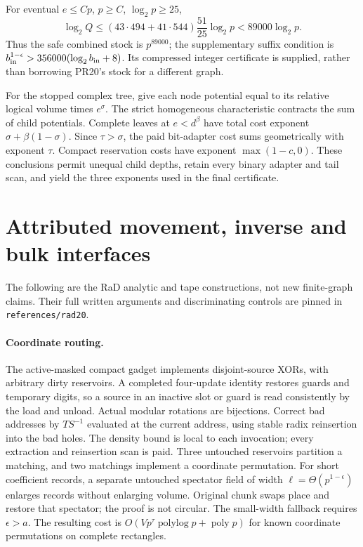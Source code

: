 \documentclass[11pt]{article}
\begin{document}
For eventual $e\le Cp$, $p\ge C$, $\log_2p\ge25$,
\[
 \log_2 Q\le(43\cdot494+41\cdot544)\frac{51}{25}\log_2p
 <89000\log_2p.
\]
Thus the safe combined stock is $p^{89000}$; the supplementary suffix
condition is
$b_{\rm in}^{1-\epsilon}>356000(\log_2 b_{\rm in}+8)$.
Its compressed integer certificate is supplied, rather than borrowing
PR20's stock for a different graph.

For the stopped complex tree, give each node potential equal to its
relative logical volume times $e^\sigma$. The strict homogeneous
characteristic contracts the sum of child potentials. Complete leaves
at $e<d^\beta$ have total cost exponent
$\sigma+\beta(1-\sigma)$. Since $\tau>\sigma$, the paid bit-adapter
cost sums geometrically with exponent $\tau$. Compact reservation costs
have exponent $\max(1-c,0)$. These conclusions permit unequal child
depths, retain every binary adapter and tail scan, and yield the three
exponents used in the final certificate.

\section{Attributed movement, inverse and bulk interfaces}
The following are the RaD analytic and tape constructions, not new
finite-graph claims. Their full written arguments and discriminating
controls are pinned in \texttt{references/rad20}.

\paragraph{Coordinate routing.}
The active-masked compact gadget implements disjoint-source XORs, with
arbitrary dirty reservoirs. A completed four-update identity restores
guards and temporary digits, so a source in an inactive slot or guard is
read consistently by the load and unload. Actual modular rotations are
bijections. Correct bad addresses by $T S^{-1}$ evaluated at the current
address, using stable radix reinsertion into the bad holes. The density
bound is local to each invocation; every extraction and reinsertion scan
is paid. Three untouched reservoirs partition a matching, and two
matchings implement a coordinate permutation. For short coefficient
records, a separate untouched spectator field of width
$\ell=\Theta(p^{1-\epsilon})$ enlarges records without enlarging volume.
Original chunk swaps place and restore that spectator; the proof is not
circular. The small-width fallback requires $\epsilon>a$. The resulting
cost is $O(Vp^\tau\operatorname{polylog}p+\operatorname{poly}p)$ for
known coordinate permutations on complete rectangles.
\end{document}
